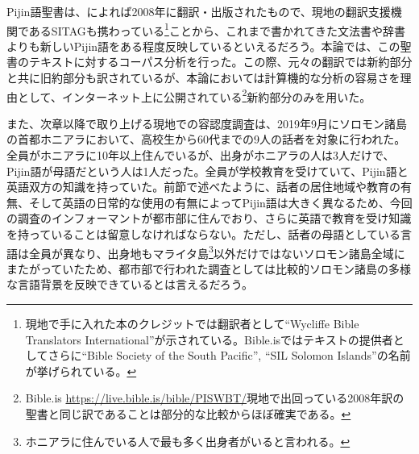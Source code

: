 Pijin語聖書は、\cite{solomontimes}によれば2008年に翻訳・出版されたもので、現地の翻訳支援機関であるSITAGも携わっている\footnote{現地で手に入れた本のクレジットでは翻訳者として``Wycliffe Bible Translators International''が示されている。Bible.isではテキストの提供者としてさらに``Bible Society of the South Pacific'', ``SIL Solomon Islands''の名前が挙げられている。}ことから、これまで書かれてきた文法書や辞書よりも新しいPijin語をある程度反映しているといえるだろう。本論では、この聖書のテキストに対するコーパス分析を行った。この際、元々の翻訳では新約部分と共に旧約部分も訳されているが、本論においては計算機的な分析の容易さを理由として、インターネット上に公開されている\footnote{Bible.is \url{https://live.bible.is/bible/PISWBT/}現地で出回っている2008年訳の聖書と同じ訳であることは部分的な比較からほぼ確実である。}新約部分のみを用いた。

また、次章以降で取り上げる現地での容認度調査は、2019年9月にソロモン諸島の首都ホニアラにおいて、高校生から60代までの9人の話者を対象に行われた。全員がホニアラに10年以上住んでいるが、出身がホニアラの人は3人だけで、Pijin語が母語だという人は1人だった。全員が学校教育を受けていて、Pijin語と英語双方の知識を持っていた。前節で述べたように、話者の居住地域や教育の有無、そして英語の日常的な使用の有無によってPijin語は大きく異なるため、今回の調査のインフォーマントが都市部に住んでおり、さらに英語で教育を受け知識を持っていることは留意しなければならない。ただし、話者の母語としている言語は全員が異なり、出身地もマライタ島\footnote{ホニアラに住んでいる人で最も多く出身者がいると言われる。}以外だけではないソロモン諸島全域にまたがっていたため、都市部で行われた調査としては比較的ソロモン諸島の多様な言語背景を反映できているとは言えるだろう。
